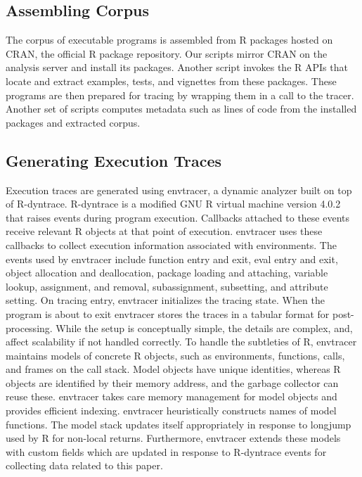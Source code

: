 \documentclass[10pt,review,sigplan,anonymous=true,authorversion=true,nonacm=true]{acmart}
\newcommand{\envtracer}{{\sf envtracer}\xspace}
\newcommand{\rdyntrace}{{\sf R-dyntrace}\xspace}
\begin{document}
\subsection{Assembling Corpus}
The corpus of executable programs is assembled from R packages hosted on CRAN,
the official R package repository. Our scripts mirror CRAN on the analysis
server and install its packages. Another script invokes the R APIs that
locate and extract examples, tests, and vignettes from these packages. These
programs are then prepared for tracing by wrapping them in a call to the tracer.
Another set of scripts computes metadata such as lines of code from the
installed packages and extracted corpus.

\subsection{Generating Execution Traces}
Execution traces are generated using \envtracer, a dynamic analyzer built on top
of \rdyntrace. \rdyntrace is a modified GNU R virtual machine version
4.0.2~\cite{oopsla19b} that raises events during program execution. Callbacks
attached to these events receive relevant R objects at that point of execution.
\envtracer uses these callbacks to collect execution information associated with
environments. The events used by \envtracer include function entry and exit,
eval entry and exit, object allocation and deallocation, package loading and
attaching, variable lookup, assignment, and removal, subassignment, subsetting,
and attribute setting. On tracing entry, \envtracer initializes the tracing
state. When the program is about to exit \envtracer stores the traces in a
tabular format for post-processing. While the setup is conceptually simple, the
details are complex, and, affect scalability if not handled correctly. To handle
the subtleties of R, \envtracer maintains models of concrete R objects, such as
environments, functions, calls, and frames on the call stack. Model objects have
unique identities, whereas R objects are identified by their memory address, and
the garbage collector can reuse these. \envtracer takes care memory management
for model objects and provides efficient indexing. \envtracer heuristically
constructs names of model functions. The model stack updates itself
appropriately in response to longjump used by R for non-local returns.
Furthermore, \envtracer extends these models with custom fields which are
updated in response to \rdyntrace events for collecting data related to this
paper.
\end{document}
